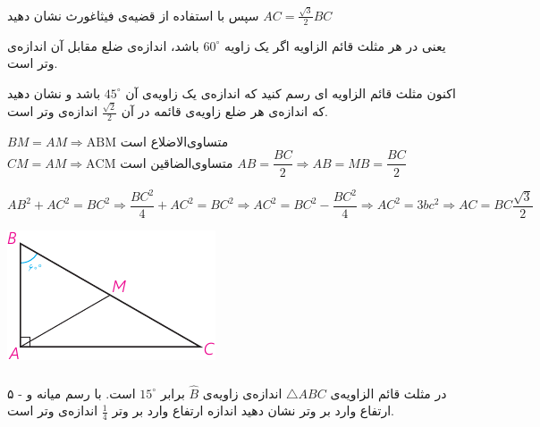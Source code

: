 \documentclass[12pt, a4paper]{book}
\begin{document}
	 سپس با استفاده از قضیه‌ی فیثاغورث نشان دهید
	$AC = \frac{\sqrt{3}}{2}BC$  
	 
	 یعنی در هر مثلث قائم الزاویه اگر یک زاویه 
	$60^{\circ}$
	  باشد، اندازه‌ی ضلع مقابل آن  اندازه‌ی وتر است.
	 
	 اکنون مثلث قائم الزاویه ای رسم کنید که اندازه‌ی یک زاویه‌ی آن 
	 $45^{\circ}$
	  باشد و نشان دهید که اندازه‌ی هر ضلع زاویه‌ی قائمه در آن 
	  $\frac{\sqrt{2}}{2}$
	   اندازه‌ی وتر است.
	   
		\begin{minipage}{.75\textwidth}
			\begin{flushleft}
					$
					BM = AM \Rightarrow \text{ABM متساوی‌الاضلاع است}
				$
				$
					CM = AM \Rightarrow \text{ACM متساوی‌الضاقین است}
				$
				$
					AB = \dfrac{BC}{2} \Rightarrow AB =MB = \dfrac{BC}{2}
				$
				
				$
					AB^2 + AC^2 = BC^2 \Rightarrow \dfrac{BC^2}{4} + AC^2 = BC^2 \Rightarrow AC^2 = BC^2 - \dfrac{BC^2}{4} \Rightarrow AC^2 = 3bc^2 \Rightarrow AC = BC \dfrac{\sqrt{3}}{2}
				$
			\end{flushleft}
		\end{minipage}
		\begin{minipage}{.25\textwidth}
		  	\begin{flushleft}
		  		\includegraphics{"Shapes/Fasl - 3/Dars 1/PDFs/P64-S1.pdf"}
		  	\end{flushleft}
		\end{minipage}

	\subsubsection[5]{}
	 ۵ - در مثلث قائم الزاویه‌ی 
	 $\triangle ABC$
	  اندازه‌ی زاویه‌ی 
	  $\widehat{B}$
	   برابر 
	   $15^{\circ}$
	    است. با رسم میانه و ارتفاع وارد بر وتر نشان دهید اندازه‌ ارتفاع وارد بر وتر 
	    $\frac14$
	     اندازه‌ی وتر است.
	     
\end{document}
